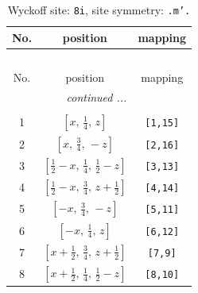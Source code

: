 \documentclass[fleqn,8pt]{jsarticle}
\begin{document}
\begin{longtable}{ccc}
\caption{Wyckoff site: {\tt 8i}, site symmetry: {\tt .m'.}}
 \\
 \hline \hline
No. & position & mapping \\ \hline \endfirsthead

\multicolumn{2}{l}{\tablename\ \thetable{}} \\
 \hline \hline
No. & position & mapping \\ \hline \endhead

 \hline \hline
\multicolumn{2}{r}{\footnotesize\it continued ...} \\ \endfoot

 \hline \hline
\multicolumn{2}{r}{} \\ \endlastfoot

1 & $\left[ x,\, \frac{1}{4},\, z \right]$ & {\tt [1,15]} \\ \hline
2 & $\left[ x,\, \frac{3}{4},\, - z \right]$ & {\tt [2,16]} \\ \hline
3 & $\left[ \frac{1}{2} - x,\, \frac{1}{4},\, \frac{1}{2} - z \right]$ & {\tt [3,13]} \\ \hline
4 & $\left[ \frac{1}{2} - x,\, \frac{3}{4},\, z + \frac{1}{2} \right]$ & {\tt [4,14]} \\ \hline
5 & $\left[ - x,\, \frac{3}{4},\, - z \right]$ & {\tt [5,11]} \\ \hline
6 & $\left[ - x,\, \frac{1}{4},\, z \right]$ & {\tt [6,12]} \\ \hline
7 & $\left[ x + \frac{1}{2},\, \frac{3}{4},\, z + \frac{1}{2} \right]$ & {\tt [7,9]} \\ \hline
8 & $\left[ x + \frac{1}{2},\, \frac{1}{4},\, \frac{1}{2} - z \right]$ & {\tt [8,10]} \\
\end{longtable}
\renewcommand{\arraystretch}{1.2}
\end{document}
